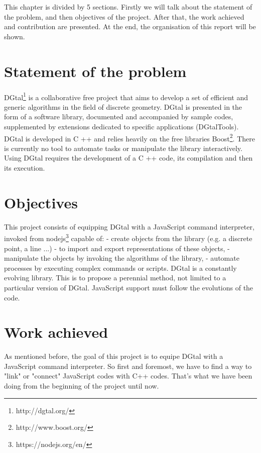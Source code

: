 This chapter is divided by 5 sections. Firstly we will talk about the statement of the problem, and then objectives of the project. After that, the work achieved and contribution are presented. At the end, the organisation of this report will be shown.

\section{Statement of the problem}

DGtal\footnote{http://dgtal.org/} is a collaborative free project that aims to develop a set of efficient and generic algorithms in the field of discrete geometry. DGtal is presented in the form of a software library, documented and accompanied by sample codes, supplemented by extensions dedicated to specific applications (DGtalTools). DGtal is developed in C ++ and relies heavily on the free libraries Boost\footnote{http://www.boost.org/}. There is currently no tool to automate tasks or manipulate the library interactively. Using DGtal requires the development of a C ++ code, its compilation and then its execution.

\section{Objectives}

This project consists of equipping DGtal with a JavaScript command interpreter, invoked from nodejs\footnote{https://nodejs.org/en/} capable of:\newline
- create objects from the library (e.g. a discrete point, a line ...)\newline
- to import and export representations of these objects,\newline
- manipulate the objects by invoking the algorithms of the library,\newline
- automate processes by executing complex commands or scripts.\newline
DGtal is a constantly evolving library. This is to propose a perennial method, not limited to a particular version of DGtal. JavaScript support must follow the evolutions of the code.

\section{Work achieved}

As mentioned before, the goal of this project is to equipe DGtal with a JavaScript command interpreter. So first and foremost, we have to find a way to "link" or "connect" JavaScript codes with C++ codes. That's what we have been doing from the beginning of the project until now.

